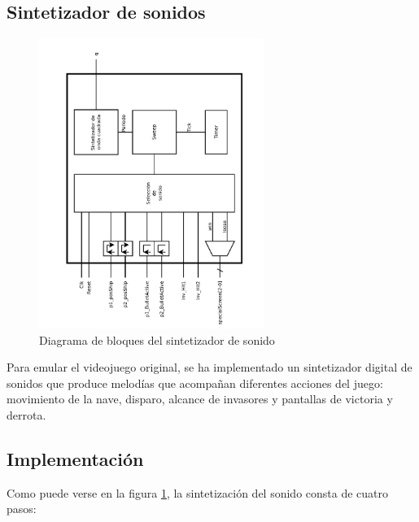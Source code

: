 \subsection{Sintetizador de sonidos}
\label{toneGen}

\begin{figure}[H]
	\centering
	\includegraphics[width=0.65\textwidth, angle=-90] {toneGen_block.pdf}
	\caption{Diagrama de bloques del sintetizador de sonido}\label{fig:toneGen_block}
\end{figure}

Para emular el videojuego original, se ha implementado un sintetizador digital de sonidos que produce melodías que acompañan diferentes acciones del juego: movimiento de la nave, disparo, alcance de invasores y pantallas de victoria y derrota. 

\subsection{Implementación}
Como puede verse en la figura \ref{fig:toneGen_block}, la sintetización del sonido consta de cuatro pasos:

